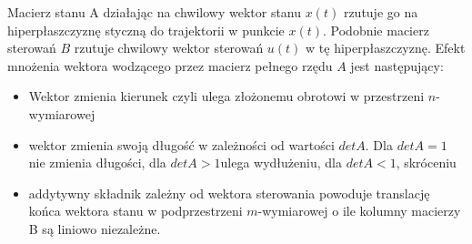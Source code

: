 \documentclass{article}
\begin{document}
		Macierz stanu A działając na chwilowy wektor stanu $x(t)$ rzutuje go na hiperpłaszczyznę
		styczną do trajektorii w punkcie $x(t)$. Podobnie macierz sterowań $B$ rzutuje chwilowy
		wektor sterowań $u(t)$ w tę hiperpłaszczyznę. Efekt mnożenia wektora wodzącego przez
		macierz pełnego rzędu $A$ jest następujący:
		\begin{itemize}
			\item Wektor zmienia kierunek czyli ulega złożonemu obrotowi
				w przestrzeni $n$-wymiarowej
			\item wektor zmienia swoją długość w zależności od wartości $det A$.
				Dla $det A =1$ nie
				zmienia długości, dla $det A > 1 $ulega wydłużeniu,
				dla $det A < 1$, skróceniu
			\item addytywny składnik zależny od wektora sterowania powoduje translację końca
				wektora stanu w podprzestrzeni $m$-wymiarowej o ile kolumny macierzy B są
				liniowo niezależne.
		\end{itemize}
\end{document}
